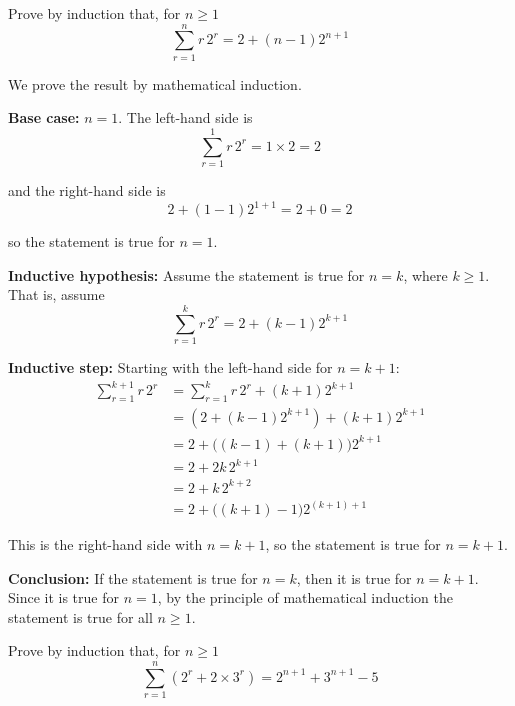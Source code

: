 \documentclass[leqno]{article}
\begin{document}
\djsFrontMatter
\begin{enumerate}[
  label=\textbf{\arabic*.},
  leftmargin=*,
  topsep=0pt,
  partopsep=0pt,
  parsep=0pt
]

\questionitem

Prove by induction that, for $n \geq 1$
\[
\sum_{r=1}^{n} r\,2^r = 2 + (n-1)2^{n+1}
\]

\vspace*{10pt}

\begin{djsSolution}
We prove the result by mathematical induction.

\textbf{Base case:} $n=1$. The left-hand side is
\[
\sum_{r=1}^{1} r\,2^r = 1\times 2 = 2
\]

and the right-hand side is
\[
2+(1-1)2^{1+1}=2+0=2
\]

so the statement is true for $n=1$.

\textbf{Inductive hypothesis:} Assume the statement is true for $n=k$, where $k \geq 1$. That is, assume
\[
\sum_{r=1}^{k} r\,2^r = 2 + (k-1)2^{k+1}
\]

\textbf{Inductive step:} Starting with the left-hand side for $n=k+1$:
\begin{align*}
\sum_{r=1}^{k+1} r\,2^r
&= \sum_{r=1}^{k} r\,2^r + (k+1)2^{k+1} \\
&= \left(2+(k-1)2^{k+1}\right) + (k+1)2^{k+1} \\
&= 2 + \bigl((k-1)+(k+1)\bigr)2^{k+1} \\
&= 2 + 2k\,2^{k+1} \\
&= 2 + k\,2^{k+2} \\
&= 2 + \bigl((k+1)-1\bigr)2^{(k+1)+1}
\end{align*}

This is the right-hand side with $n=k+1$, so the statement is true for $n=k+1$.

\textbf{Conclusion:} If the statement is true for $n=k$, then it is true for $n=k+1$. Since it is true for $n=1$, by the principle of mathematical induction the statement is true for all $n \geq 1$.
\end{djsSolution}


\newpage

\questionitem

Prove by induction that, for $n \geq 1$
\[
\sum_{r=1}^{n} \left(2^r + 2 \times 3^r\right) = 2^{n+1} + 3^{n+1} - 5
\]


\end{enumerate}
\end{document}
